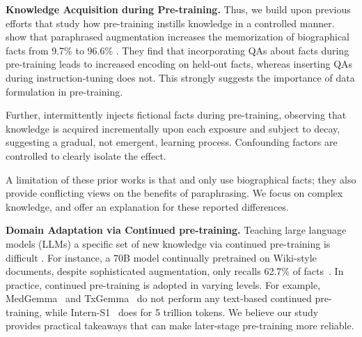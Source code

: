 \documentclass[11pt]{article}
\begin{document}
\textbf{Knowledge Acquisition during Pre-training.} Thus, we build upon previous efforts that study how pre-training instills knowledge in a controlled manner. \citet{allen2024physics} show that paraphrased augmentation increases the memorization of biographical facts from 9.7\% to 96.6\% . They find that incorporating QAs about facts during pre-training leads to increased encoding on held-out facts, whereas inserting QAs during instruction-tuning does not. This strongly suggests the importance of  data formulation in pre-training.

Further, \citet{chang2024large} intermittently injects fictional facts during pre-training, observing that knowledge is acquired incrementally upon each exposure and subject to decay, suggesting a gradual, not emergent, learning process. Confounding factors are controlled to clearly isolate the effect.

A limitation of these prior works is that \citet{chang2024large} and \citet{allen2023physics} only use biographical facts; they also provide conflicting views on the benefits of paraphrasing. We focus on complex knowledge, and offer an explanation for these reported differences.

\textbf{Domain Adaptation via Continued pre-training.} 
Teaching large language models (LLMs) a specific set of new knowledge via continued pre-training is difficult
\citep{wang2021can, jang2021towards, hu2023meta,ovadia2024fine, hoffbauer-etal-2024-knowledge}. For instance, a 70B model continually pretrained on Wiki-style documents, despite sophisticated augmentation, only recalls 62.7\% of facts~\citep{jiang2024instruction}. In practice, continued pre-training is adopted in varying levels. For example, MedGemma~\citep{sellergren2025medgemma} and TxGemma~\citep{wang2025txgemma} do not perform any text-based continued pre-training, while Intern-S1~\citep{bai2025intern} does for 5 trillion tokens. We believe our study provides practical takeaways that can make later-stage pre-training more reliable.

\end{document}
